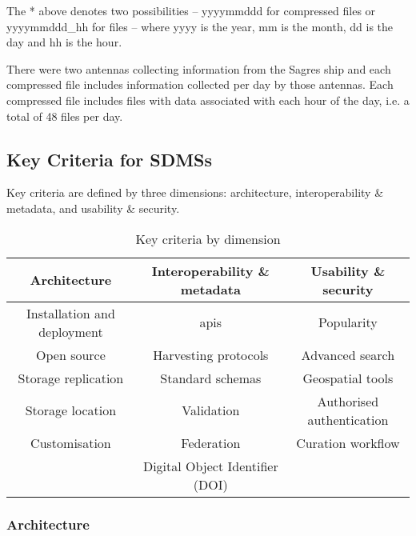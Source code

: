 The * above denotes two possibilities -- yyyymmddd for compressed files or yyyymmddd\_hh for files -- where yyyy is the year, mm is the month, dd is the day and hh is the hour. 

There were two antennas collecting information from the Sagres ship and each compressed file includes information collected per day by those antennas. Each compressed file includes files with data associated with each hour of the day, i.e. a total of 48 files per day.
  
\newpage  
  
\subsection{Key Criteria for SDMSs}
  
Key criteria are defined by three dimensions: architecture, interoperability \& metadata, and usability \& security.
    
\begin{table}[!h]
    \centering
    \caption{Key criteria by dimension}
    \begin{tabular}{|c|c|c|} 
        \hline
        Architecture                & Interoperability \& metadata    & Usability \& security      \\ 
        \hline
        Installation and deployment & \gls{api}s                            & Popularity                 \\
        Open source                 & Harvesting protocols            & Advanced search            \\
        Storage replication         & Standard schemas                & Geospatial tools           \\
        Storage location            & Validation                      & Authorised authentication  \\
        Customisation               & Federation                      & Curation workflow          \\ 
        \cline{1-1}\cline{3-3}
        \multicolumn{1}{l|}{}       & Digital Object Identifier (DOI) & \multicolumn{1}{l}{}       \\
        \cline{2-2}
    \end{tabular}
\end{table}
    
\subsubsection{Architecture}
	
